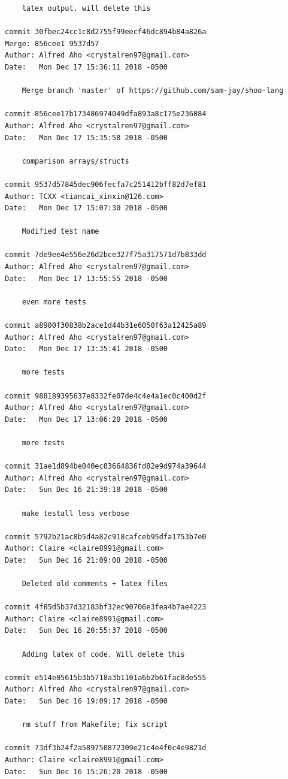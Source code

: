 \documentclass[12pt]{article}
\begin{document}
\begin{lstlisting}
    latex output. will delete this

commit 30fbec24cc1c8d2755f99eecf46dc894b84a826a
Merge: 856cee1 9537d57
Author: Alfred Aho <crystalren97@gmail.com>
Date:   Mon Dec 17 15:36:11 2018 -0500

    Merge branch 'master' of https://github.com/sam-jay/shoo-lang

commit 856cee17b173486974049dfa893a8c175e236084
Author: Alfred Aho <crystalren97@gmail.com>
Date:   Mon Dec 17 15:35:58 2018 -0500

    comparison arrays/structs

commit 9537d57845dec906fecfa7c251412bff82d7ef81
Author: TCXX <tiancai_xinxin@126.com>
Date:   Mon Dec 17 15:07:30 2018 -0500

    Modified test name

commit 7de9ee4e556e26d2bce327f75a317571d7b833dd
Author: Alfred Aho <crystalren97@gmail.com>
Date:   Mon Dec 17 13:55:55 2018 -0500

    even more tests

commit a8900f30838b2ace1d44b31e6050f63a12425a89
Author: Alfred Aho <crystalren97@gmail.com>
Date:   Mon Dec 17 13:35:41 2018 -0500

    more tests

commit 988189395637e8332fe07de4c4e4a1ec0c400d2f
Author: Alfred Aho <crystalren97@gmail.com>
Date:   Mon Dec 17 13:06:20 2018 -0500

    more tests

commit 31ae1d894be040ec03664836fd82e9d974a39644
Author: Alfred Aho <crystalren97@gmail.com>
Date:   Sun Dec 16 21:39:18 2018 -0500

    make testall less verbose

commit 5792b21ac8b5d4a82c918cafceb95dfa1753b7e0
Author: Claire <claire8991@gmail.com>
Date:   Sun Dec 16 21:09:08 2018 -0500

    Deleted old comments + latex files

commit 4f85d5b37d32183bf32ec90706e3fea4b7ae4223
Author: Claire <claire8991@gmail.com>
Date:   Sun Dec 16 20:55:37 2018 -0500

    Adding latex of code. Will delete this

commit e514e05615b3b5718a3b1101a6b2b61fac8de555
Author: Alfred Aho <crystalren97@gmail.com>
Date:   Sun Dec 16 19:09:17 2018 -0500

    rm stuff from Makefile; fix script

commit 73df3b24f2a589750872309e21c4e4f0c4e9821d
Author: Claire <claire8991@gmail.com>
Date:   Sun Dec 16 15:26:20 2018 -0500


\end{lstlisting}
\end{document}
